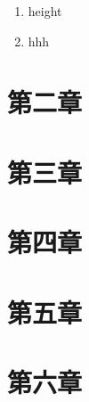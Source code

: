 \documentclass[UTF8]{report}
\theoremstyle{MyLineTheoremStyle} %
\theoremstyle{MyBlockTheoremStyle} %
\theoremstyle{MySubsubsectionStyle} %
\begin{document}
\begin{enumerate}
\item height
\item hhh
\end{enumerate}















































































































\chapter{第二章}\thispagestyle{fancy}
\chapter{第三章}\thispagestyle{fancy}
\chapter{第四章}\thispagestyle{fancy}
\chapter{第五章}\thispagestyle{fancy}
\chapter{第六章}\thispagestyle{fancy}
\end{document}
